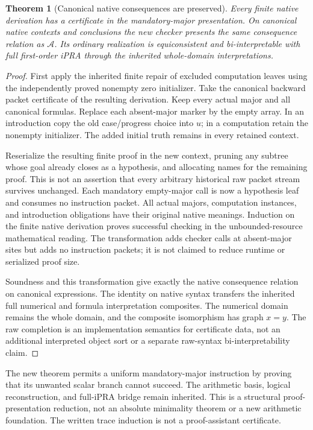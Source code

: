 \documentclass[11pt,letterpaper]{article}
\newtheorem{theorem}{Theorem}[section]
\theoremstyle{definition}\newtheorem{definition}[theorem]{Definition}
\theoremstyle{remark}\newtheorem{remark}[theorem]{Remark}
\begin{document}
\begin{theorem}[Canonical native consequences are preserved]
Every finite native derivation has a certificate in the mandatory-major
presentation.  On canonical native contexts and conclusions the new
checker presents the same consequence relation as $\mathcal A$.
Its ordinary realization is equiconsistent and bi-interpretable with
full first-order iPRA through the inherited whole-domain interpretations.
\end{theorem}
\begin{proof}
First apply the inherited finite repair of excluded computation leaves
using the independently proved nonempty zero initializer.  Take the
canonical backward packet certificate of the resulting derivation.
Keep every actual major and all canonical formulas. Replace each
absent-major marker by the empty array.  In an introduction copy the old
case/progress choice into $u$; in a computation retain the nonempty
initializer.  The added initial truth remains in every retained context.

Reserialize the resulting finite proof in the new context, pruning
any subtree whose goal already closes as a hypothesis, and allocating
names for the remaining proof. This is not an assertion
that every arbitrary historical raw packet stream survives unchanged.
Each mandatory empty-major call is now a hypothesis leaf and consumes
no instruction packet.  All actual majors, computation instances, and
introduction obligations have their original native meanings.  Induction
on the finite native derivation proves successful checking in the
unbounded-resource mathematical reading.  The transformation adds
checker calls at absent-major sites but adds no instruction packets;
it is not claimed to reduce runtime or serialized proof size.

Soundness and this transformation give exactly the native consequence
relation on canonical expressions.  The identity on native syntax
transfers the inherited full numerical and formula interpretation
composites.  The numerical domain remains the whole domain, and the
composite isomorphism has graph $x=y$.  The raw completion is an
implementation semantics for certificate data, not an additional
interpreted object sort or a separate raw-syntax bi-interpretability
claim.
\end{proof}

The new theorem permits a uniform mandatory-major instruction by proving
that its unwanted scalar branch cannot succeed.  The arithmetic basis,
logical reconstruction, and full-iPRA bridge remain inherited.  This is a
structural proof-presentation reduction, not an absolute minimality
theorem or a new arithmetic foundation.  The written trace induction is
not a proof-assistant certificate.
\end{document}
